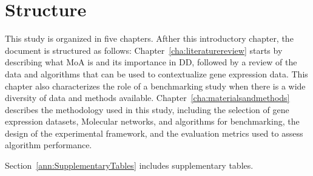 \section{Structure} %
\label{sec:structure}

This study is organized in five chapters.
Afther this introductory chapter, the document is structured as follows: Chapter~\ref{cha:literaturereview} starts by describing what \gls{MoA} is and its importance in \gls{DD}, followed by a review of the data and algorithms that can be used to contextualize gene expression data. This chapter also characterizes the role of a benchmarking study when there is a wide diversity of data and methods available. 
Chapter~\ref{cha:materialsandmethods} describes the methodology used in this study, including the selection of gene expression datasets, \gls{Molecular network}s, and algorithms for benchmarking, the design of the experimental framework, and the evaluation metrics used to assess algorithm performance.

Section~\ref{ann:SupplementaryTables} includes supplementary tables.